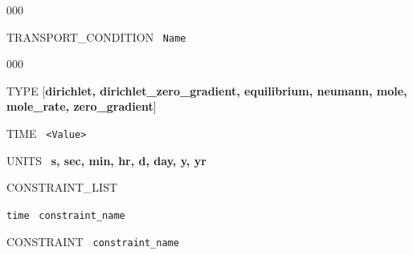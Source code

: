 \documentclass[12pt]{article}
\begin{document}
\begin{deflist}{000}
\item[TRANSPORT\_CONDITION] \ {\tt Name}

\begin{deflist}{000}
\item[TYPE] [{\bf dirichlet, dirichlet\_zero\_gradient, equilibrium, neumann, mole, mole\_rate, \linebreak zero\_gradient}]
\item[TIME] \ {\tt <Value>}
\item[UNITS] \ {\bf s, sec, min, hr, d, day, y, yr}
\item[CONSTRAINT\_LIST]
\item {\tt time} \ {\tt constraint\_name}
\item[\keyend]
\item[CONSTRAINT] \ {\tt constraint\_name}
\end{deflist}
\item[\keyend]
\end{deflist}

\end{document}
